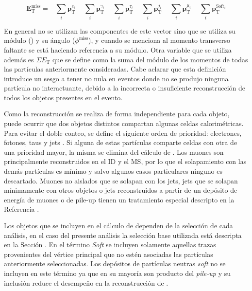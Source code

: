 \begin{equation}
\textbf{E}_{\text{T}}^{\text{miss}} = -\sum_{i}\textbf{p}_{\text{T}}^{e_i}-\sum_{i}\textbf{p}_{\text{T}}^{\gamma_i}-\sum_{i}\textbf{p}_{\text{T}}^{\tau_i}-\sum_{i}\textbf{p}_{\text{T}}^{j_i}-\sum_{i}\textbf{p}_{\text{T}}^{\mu_i}-\sum_{i}\textbf{p}_{\text{T}}^{\text{Soft}_i}
\end{equation}


En general no se utilizan las componentes de este vector sino que se utiliza su módulo (\met) y su ángulo ($\phi^{\text{miss}}$), y cuando se menciona al momento transverso faltante se está haciendo referencia a su módulo. Otra variable que se utiliza además es $\Sigma E_{\text{T}}$ que se define como la suma del módulo de los momentos de todas las partículas anteriormente consideradas. Cabe aclarar que esta definición introduce un sesgo a tener \met no nula en eventos donde no se produjo ninguna partícula no interactuante, debido a la incorrecta o insuficiente reconstrucción de todos los objetos presentes en el evento.

Como la reconstrucción se realiza de forma independiente para cada objeto, puede ocurrir que dos objetos distintos compartan algunas celdas calorimétricas. Para evitar el doble conteo, se define el siguiente orden de prioridad: electrones, fotones, taus y jets \cite{PERF-2011-07, PERF-2014-04}. Si alguna de estas partículas comparte celdas con otra de una prioridad mayor, la misma se elimina del cálculo de \met. Los muones son principalmente reconstruidos en el ID y el MS, por lo que el solapamiento con las demás partículas es mínimo y salvo algunos casos particulares ninguno es descartado. Muones no aislados que se solapan con los jets, jets que se solapan mínimamente con otros objetos o jets reconstruidos a partir de un depósito de energía de muones o de pile-up tienen un tratamiento especial descripto en la Referencia \cite{PERF-2016-07}.

Los objetos que se incluyen en el cálculo de \met dependen de la selección de cada análisis, en el caso del presente análisis la selección base utilizada está descripta en la Sección . En el término \textit{Soft} se incluyen solamente aquellas trazas provenientes del vértice principal que no estén asociadas las partículas anteriormente seleccionadas. Los depósitos de partículas neutras \textit{soft} no se incluyen en este término ya que en su mayoría son producto del \textit{pile-up} y su inclusión reduce el desempeño en la reconstrucción de \met. 



